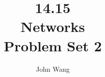 \documentclass[psamsfonts]{amsart}
\title{14.15 \\
Networks \\
Problem Set 2}
\author{John Wang}
\newenvironment{prob}{{\bfseries Problem:}}
\begin{document}
\maketitle

Collaborators: Ryan Liu, Bonny Jain

\section{Problem 1}

\begin{prob}
  Let the directed graph $G$ be a ring: node $i$ is connected to $i + 1$ if $i < m$ and $m$ is connected to 1. Compute both eigenvalue centrality and Katz centrality (with $\beta = 1$). Comment on your result.

  Do the same for a $k$-regular undirected network (i.e., an undirected network in which every vertex has degree $k$). You may find the steps outlined in Newman Problem 7.1 helpful. Comment on your result.
\end{prob}
\end{document}
